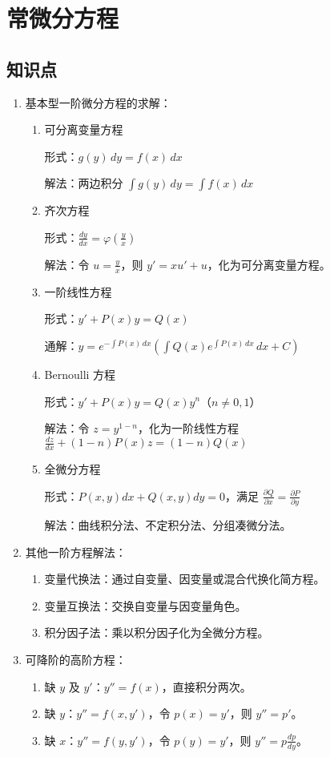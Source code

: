 \documentclass[UTF8]{ctexart}
\theoremstyle{remark}
\begin{document}
\section{常微分方程}  
\subsection*{知识点}
\begin{enumerate}

\item 基本型一阶微分方程的求解：  
\begin{enumerate}
	\item 可分离变量方程  
	
形式：\(g(y) \, dy = f(x) \, dx\)  
	
解法：两边积分 \(\int g(y) \, dy = \int f(x) \, dx\)  
	\item 齐次方程  
	
形式：\(\frac{dy}{dx} = \varphi\left(\frac{y}{x}\right)\)  
	
解法：令 \(u = \frac{y}{x}\)，则 \(y' = x u' + u\)，化为可分离变量方程。  
	\item 一阶线性方程  
	
形式：\(y' + P(x)y = Q(x)\)  
	
通解：\(y = e^{-\int P(x) \, dx} \left( \int Q(x) e^{\int P(x) \, dx} \, dx + C \right)\)  
	\item Bernoulli 方程  
	
形式：\(y' + P(x)y = Q(x)y^n\)（\(n \neq 0, 1\)）  
	
解法：令 \(z = y^{1-n}\)，化为一阶线性方程 \(\frac{dz}{dx} + (1-n)P(x)z = (1-n)Q(x)\)  
	\item 全微分方程  
	
形式：\(P(x,y)dx + Q(x,y)dy = 0\)，满足 \(\frac{\partial Q}{\partial x} = \frac{\partial P}{\partial y}\)  
	
解法：曲线积分法、不定积分法、分组凑微分法。  
\end{enumerate}  

\item 其他一阶方程解法：  
\begin{enumerate}
	\item 变量代换法：通过自变量、因变量或混合代换化简方程。  
	\item 变量互换法：交换自变量与因变量角色。  
	\item 积分因子法：乘以积分因子化为全微分方程。  
\end{enumerate}  

\item 可降阶的高阶方程：  
\begin{enumerate}
	\item 缺 \(y\) 及 \(y'\)：\(y'' = f(x)\)，直接积分两次。  
	\item 缺 \(y\)：\(y'' = f(x, y')\)，令 \(p(x) = y'\)，则 \(y'' = p'\)。  
	\item 缺 \(x\)：\(y'' = f(y, y')\)，令 \(p(y) = y'\)，则 \(y'' = p \frac{dp}{dy}\)。  
\end{enumerate}  


\end{enumerate}
\end{document}
